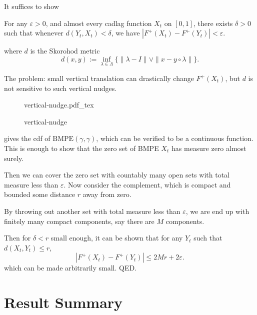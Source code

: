 \documentclass{beamer}
\newcommand{\incfig}[1]{%


    \def\svgwidth{\columnwidth}
    {#1.pdf_tex}
}
\begin{document}
\begin{frame}
	It suffices to show
	\begin{lemma}
		For any $\varepsilon>0$, and almost every cadlag function $X_t$ on $[0,1]$, there exists $\delta>0$ such that whenever $d(Y_t, X_t) < \delta$, we have $|F^+(X_t) - F^+(Y_t)|< \varepsilon$.

		where $d$ is the Skorohod metric
		 \[
			d(x,y) := \inf _{\lambda \in \Lambda}\{\|\lambda-I\| \vee\|x-y \circ \lambda\|\}
		.\] 
	\end{lemma}
	\pause

	The problem: small vertical translation can drastically change $F^+(X_t)$, but $d$ is not sensitive to such vertical nudges. 
\begin{figure}[ht]
    \centering
    \incfig{vertical-nudge}
    \caption{vertical-nudge}
    \label{fig:vertical-nudge}
\end{figure}
	
\end{frame}

\begin{frame}
	\cite{kosyginaConvergenceNonconvergenceScaled2022} gives the cdf of $\text{BMPE}(\gamma, \gamma)$, which can be verified to be a continuous function. This is enough to show that the zero set of BMPE $X_t$ has measure zero almost surely.

	\pause

	Then we can cover the zero set with countably many open sets with total measure less than $\varepsilon$. Now consider the complement, which is compact and bounded some distance $r$ away from zero. 

	\pause

	By throwing out another set with total measure less than $\varepsilon$, we are end up with finitely many compact components, say there are $M$ components.

	\pause

	Then for $\delta< r$ small enough, it can be shown that for any $Y_t $ such that $d(X_t, Y_t) \le  r$,
	\[
		|F^+(X_t) - F^+(Y_t)| \le 2 M r + 2 \varepsilon
	.\] 
	which can be made arbitrarily small. QED.
\end{frame}



\section{Result Summary}
\end{document}

